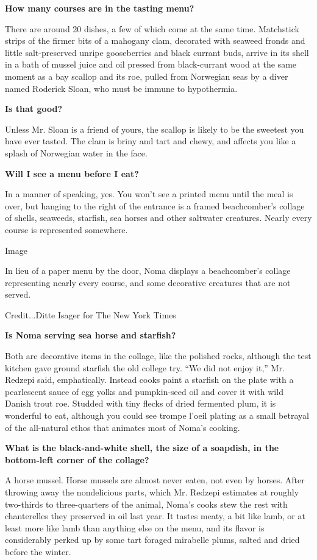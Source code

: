 \textbf{How many courses are in the tasting menu?}

There are around 20 dishes, a few of which come at the same time.
Matchstick strips of the firmer bits of a mahogany clam, decorated with
seaweed fronds and little salt-preserved unripe gooseberries and black
currant buds, arrive in its shell in a bath of mussel juice and oil
pressed from black-currant wood at the same moment as a bay scallop and
its roe, pulled from Norwegian seas by a diver named Roderick Sloan, who
must be immune to hypothermia.

\textbf{Is that good?}

Unless Mr. Sloan is a friend of yours, the scallop is likely to be the
sweetest you have ever tasted. The clam is briny and tart and chewy, and
affects you like a splash of Norwegian water in the face.

\textbf{Will I see a menu before I eat?}

In a manner of speaking, yes. You won't see a printed menu until the
meal is over, but hanging to the right of the entrance is a framed
beachcomber's collage of shells, seaweeds, starfish, sea horses and
other saltwater creatures. Nearly every course is represented somewhere.

Image

In lieu of a paper menu by the door, Noma displays a beachcomber's
collage representing nearly every course, and some decorative creatures
that are not served.

Credit...Ditte Isager for The New York Times

\textbf{Is Noma serving sea horse and starfish?}

Both are decorative items in the collage, like the polished rocks,
although the test kitchen gave ground starfish the old college try. ``We
did not enjoy it,'' Mr. Redzepi said, emphatically. Instead cooks paint
a starfish on the plate with a pearlescent sauce of egg yolks and
pumpkin-seed oil and cover it with wild Danish trout roe. Studded with
tiny flecks of dried fermented plum, it is wonderful to eat, although
you could see trompe l'oeil plating as a small betrayal of the
all-natural ethos that animates most of Noma's cooking.

\textbf{What is the black-and-white shell, the size of a soapdish, in
the bottom-left corner of the collage?}

A horse mussel. Horse mussels are almost never eaten, not even by
horses. After throwing away the nondelicious parts, which Mr. Redzepi
estimates at roughly two-thirds to three-quarters of the animal, Noma's
cooks stew the rest with chanterelles they preserved in oil last year.
It tastes meaty, a bit like lamb, or at least more like lamb than
anything else on the menu, and its flavor is considerably perked up by
some tart foraged mirabelle plums, salted and dried before the winter.

